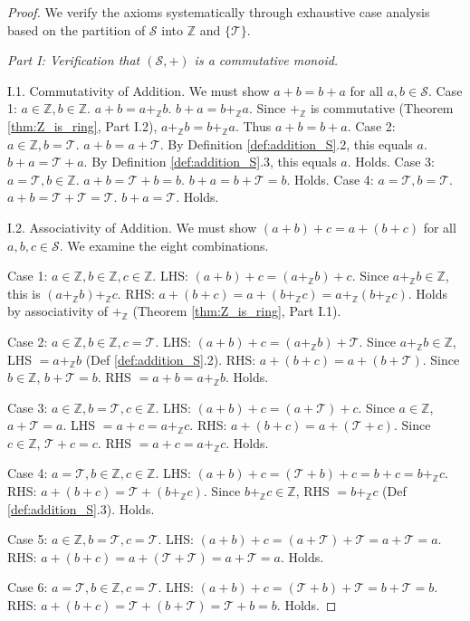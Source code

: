 \documentclass[11pt, a4paper]{article}
\theoremstyle{plain}
\theoremstyle{definition}
\numberwithin{equation}{section}
\newcommand{\Z}{\mathbb{Z}}
\newcommand{\Tobj}{\mathcal{T}} %
\newcommand{\SemiringS}{\mathcal{S}}
\begin{document}
\begin{proof}
We verify the axioms systematically through exhaustive case analysis based on the partition of $\SemiringS$ into $\Z$ and $\{\Tobj\}$.

\emph{Part I: Verification that $(\SemiringS, +)$ is a commutative monoid.}

I.1. Commutativity of Addition. We must show $a+b = b+a$ for all $a, b \in \SemiringS$.
Case 1: $a \in \Z, b \in \Z$. $a+b = a+_{\Z} b$. $b+a = b+_{\Z} a$. Since $+_{\Z}$ is commutative (Theorem \ref{thm:Z_is_ring}, Part I.2), $a+_{\Z} b=b+_{\Z} a$. Thus $a+b=b+a$.
Case 2: $a \in \Z, b=\Tobj$. $a+b = a+\Tobj$. By Definition \ref{def:addition_S}.2, this equals $a$. $b+a = \Tobj+a$. By Definition \ref{def:addition_S}.3, this equals $a$. Holds.
Case 3: $a=\Tobj, b \in \Z$. $a+b = \Tobj+b = b$. $b+a = b+\Tobj = b$. Holds.
Case 4: $a=\Tobj, b=\Tobj$. $a+b = \Tobj+\Tobj = \Tobj$. $b+a = \Tobj$. Holds.

I.2. Associativity of Addition. We must show $(a+b)+c = a+(b+c)$ for all $a, b, c \in \SemiringS$. We examine the eight combinations.

Case 1: $a \in \Z, b \in \Z, c \in \Z$.
LHS: $(a+b)+c = (a+_{\Z} b)+c$. Since $a+_{\Z} b \in \Z$, this is $(a+_{\Z} b)+_{\Z} c$.
RHS: $a+(b+c) = a+(b+_{\Z} c) = a+_{\Z}(b+_{\Z} c)$.
Holds by associativity of $+_{\Z}$ (Theorem \ref{thm:Z_is_ring}, Part I.1).

Case 2: $a \in \Z, b \in \Z, c=\Tobj$.
LHS: $(a+b)+c = (a+_{\Z} b)+\Tobj$. Since $a+_{\Z} b \in \Z$, LHS $= a+_{\Z} b$ (Def \ref{def:addition_S}.2).
RHS: $a+(b+c) = a+(b+\Tobj)$. Since $b \in \Z$, $b+\Tobj=b$. RHS $= a+b = a+_{\Z} b$. Holds.

Case 3: $a \in \Z, b=\Tobj, c \in \Z$.
LHS: $(a+b)+c = (a+\Tobj)+c$. Since $a \in \Z$, $a+\Tobj=a$. LHS $= a+c = a+_{\Z} c$.
RHS: $a+(b+c) = a+(\Tobj+c)$. Since $c \in \Z$, $\Tobj+c=c$. RHS $= a+c = a+_{\Z} c$. Holds.

Case 4: $a=\Tobj, b \in \Z, c \in \Z$.
LHS: $(a+b)+c = (\Tobj+b)+c = b+c = b+_{\Z} c$.
RHS: $a+(b+c) = \Tobj+(b+_{\Z} c)$. Since $b+_{\Z} c \in \Z$, RHS $= b+_{\Z} c$ (Def \ref{def:addition_S}.3). Holds.

Case 5: $a \in \Z, b=\Tobj, c=\Tobj$.
LHS: $(a+b)+c = (a+\Tobj)+\Tobj = a+\Tobj = a$.
RHS: $a+(b+c) = a+(\Tobj+\Tobj) = a+\Tobj = a$. Holds.

Case 6: $a=\Tobj, b \in \Z, c=\Tobj$.
LHS: $(a+b)+c = (\Tobj+b)+\Tobj = b+\Tobj = b$.
RHS: $a+(b+c) = \Tobj+(b+\Tobj) = \Tobj+b = b$. Holds.


\end{proof}
\end{document}
